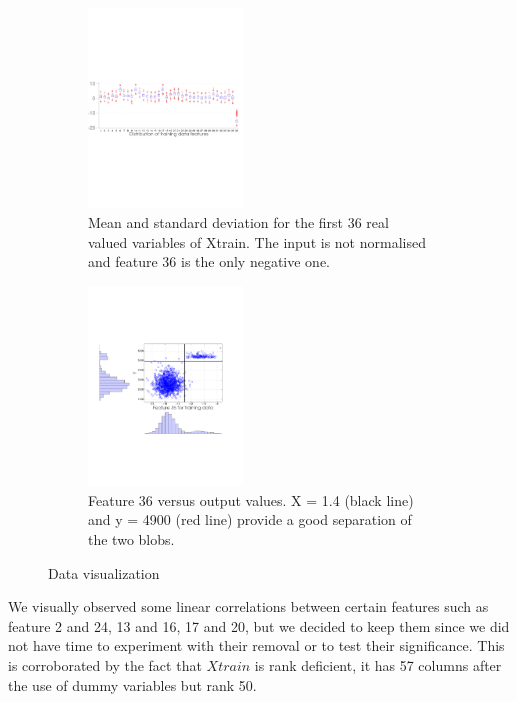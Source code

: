 \begin{figure}[ht]
  \centering
  \begin{subfigure}[b]{0.45\textwidth}
   \includegraphics[width=0.45\textwidth]{figures/distribution_regression_crop.pdf}
    \caption{Mean and standard deviation for the first 36 real valued variables of Xtrain. The input is not normalised and feature 36 is the only negative one.}
    \label{fig:dist_regression}
  \end{subfigure}
  \begin{subfigure}[b]{0.45\textwidth}
    \includegraphics[width=0.45\textwidth]{figures/feature36_13_crop.pdf}
    \caption{Feature 36 versus output values. X = 1.4 (black line) and y = 4900 (red line)  provide a good separation of the two blobs.}
    \label{fig:feature36}
  \end{subfigure}
  \caption{Data visualization}
\end{figure}

We visually observed some linear correlations between certain features such as feature 2 and 24, 13 and 16, 17 and 20, but we decided to keep them since we did not have time to experiment with their removal or to test their significance. This is corroborated by the fact that $Xtrain$ is rank deficient, it has 57 columns after the use of dummy variables but rank 50.

